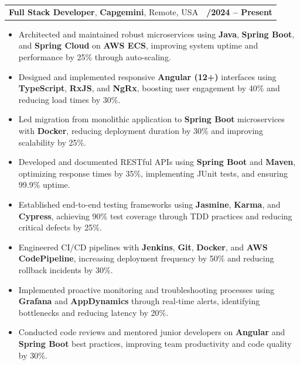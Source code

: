 \documentclass[letterpaper,11pt]{article}
\makeatletter
\newcommand{\resumeItem}[1]{
  \item\footnotesize{
    {#1 \vspace{-2pt}}
  }
}
\newcommand{\resumeSubheading}[4]{
  \vspace{-2pt}\item
    \begin{tabular*}{1.0\textwidth}[t]{l@{\extracolsep{\fill}}r}
      \textbf{\fontsize{10pt}{14pt}\selectfont #3}, \textbf{\fontsize{10pt}{14pt}\selectfont #1}, \fontsize{10pt}{14pt}\selectfont #4 & \textbf{\fontsize{10pt}{14pt}\selectfont #2} \\
    \end{tabular*}\vspace{-7pt}
}
\newcommand{\resumeItemListStart}{\begin{itemize}[leftmargin=*]}
\newcommand{\resumeItemListEnd}{\end{itemize}\vspace{-5pt}}
\makeatother
\begin{document}
    \resumeSubheading
        {Capgemini}{01/2024 -- Present}
        {Full Stack Developer}{Remote, USA}
      \resumeItemListStart
        \resumeItem{Architected and maintained robust microservices using \textbf{Java}, \textbf{Spring Boot}, and \textbf{Spring Cloud} on \textbf{AWS ECS}, improving system uptime and performance by 25\% through auto-scaling.}
        \resumeItem{Designed and implemented responsive \textbf{Angular (12+)} interfaces using \textbf{TypeScript}, \textbf{RxJS}, and \textbf{NgRx}, boosting user engagement by 40\% and reducing load times by 30\%.}
        \resumeItem{Led migration from monolithic application to \textbf{Spring Boot} microservices with \textbf{Docker}, reducing deployment duration by 30\% and improving scalability by 25\%.}
        \resumeItem{Developed and documented RESTful APIs using \textbf{Spring Boot} and \textbf{Maven}, optimizing response times by 35\%, implementing JUnit tests, and ensuring 99.9\% uptime.}
        \resumeItem{Established end-to-end testing frameworks using \textbf{Jasmine}, \textbf{Karma}, and \textbf{Cypress}, achieving 90\% test coverage through TDD practices and reducing critical defects by 25\%.}
        \resumeItem{Engineered CI/CD pipelines with \textbf{Jenkins}, \textbf{Git}, \textbf{Docker}, and \textbf{AWS CodePipeline}, increasing deployment frequency by 50\% and reducing rollback incidents by 30\%.}
        \resumeItem{Implemented proactive monitoring and troubleshooting processes using \textbf{Grafana} and \textbf{AppDynamics} through real-time alerts, identifying bottlenecks and reducing latency by 20\%.}
        \resumeItem{Conducted code reviews and mentored junior developers on \textbf{Angular} and \textbf{Spring Boot} best practices, improving team productivity and code quality by 30\%.}
      \resumeItemListEnd
\end{document}
